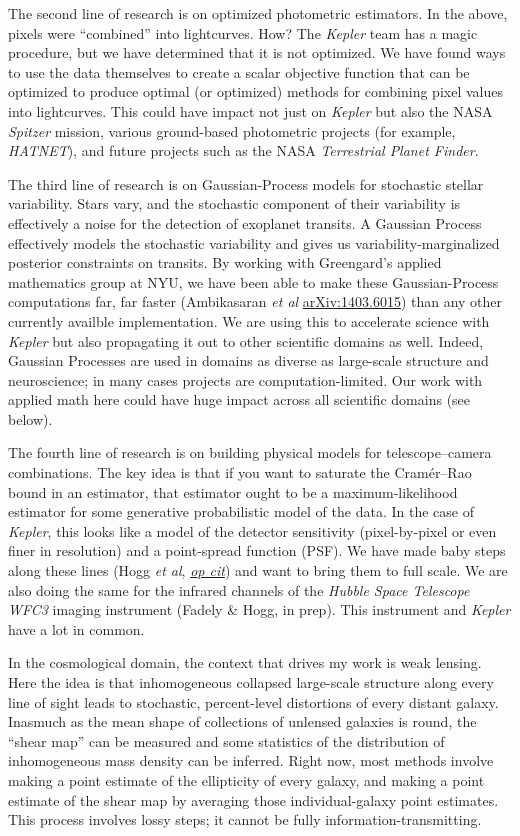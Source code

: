 \documentclass[11pt, letterpaper]{article}
\newcommand{\arxiv}[1]{\href{http://arxiv.org/abs/#1}{arXiv:#1}}
\newcommand{\opcit}[1]{\href{http://arxiv.org/abs/#1}{\textit{op cit}}}
\begin{document}
The second line of research is on optimized photometric estimators.
In the above, pixels were ``combined'' into lightcurves.
How?
The \textsl{Kepler} team has a magic procedure, but we have determined
that it is not optimized.
We have found ways to use the data themselves to create a scalar
objective function that can be optimized to produce optimal (or
optimized) methods for combining pixel values into lightcurves.
This could have impact not just on \textsl{Kepler} but also the NASA
\textsl{Spitzer} mission, various ground-based photometric projects
(for example, \textsl{HATNET}), and future projects such as the NASA
\textsl{Terrestrial Planet Finder}.

The third line of research is on Gaussian-Process models for
stochastic stellar variability.
Stars vary, and the stochastic component of their variability is
effectively a noise for the detection of exoplanet transits.
A Gaussian Process effectively models the stochastic variability and
gives us variability-marginalized posterior constraints on transits.
By working with Greengard's applied mathematics group at NYU, we have
been able to make these Gaussian-Process computations far, far faster
(Ambikasaran \textit{et al} \arxiv{1403.6015})
than any other currently availble implementation.
We are using this to accelerate science with \textsl{Kepler} but also
propagating it out to other scientific domains as well.
Indeed, Gaussian Processes are used in domains as diverse as
large-scale structure and neuroscience; in many cases projects are
computation-limited.
Our work with applied math here could have huge impact across all
scientific domains (see below).

The fourth line of research is on building physical models for
telescope--camera combinations.
The key idea is that if you want to saturate the Cram\'er--Rao bound
in an estimator, that estimator ought to be a maximum-likelihood
estimator for some generative probabilistic model of the data.
In the case of \textsl{Kepler}, this looks like a model of the
detector sensitivity (pixel-by-pixel or even finer in resolution) and
a point-spread function (PSF).  
We have made baby steps along these lines
(Hogg \textit{et al}, \opcit{1403.6015})
and want to bring them to full scale.
We are also doing the same for the infrared channels of the
\textsl{Hubble Space Telescope} \textsl{WFC3} imaging instrument
(Fadely \& Hogg, in prep).
This instrument and \textsl{Kepler} have a lot in common.

In the cosmological domain, the context that drives my work is weak
lensing.
Here the idea is that inhomogeneous collapsed large-scale structure
along every line of sight leads to stochastic, percent-level
distortions of every distant galaxy.
Inasmuch as the mean shape of collections of unlensed galaxies is
round, the ``shear map'' can be measured and some statistics of the
distribution of inhomogeneous mass density can be inferred.
Right now, most methods involve making a point estimate of the
ellipticity of every galaxy, and making a point estimate of the shear
map by averaging those individual-galaxy point estimates.
This process involves lossy steps; it cannot be fully
information-transmitting.
\end{document}
